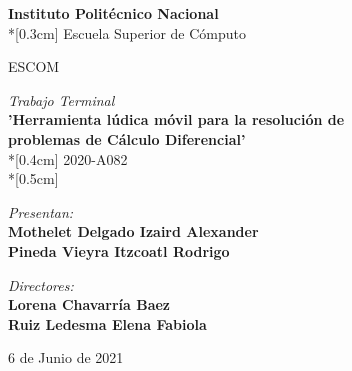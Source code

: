 
\begin{titlepage}


        \begin{center}
            \huge \textbf{Instituto Politécnico Nacional}\\*[0.3cm]%
            \LARGE {Escuela Superior de Cómputo}\\%
            \vspace{1cm}
            \begin{center}
                \LARGE{ESCOM}
            \end{center}
            \vspace{1cm}
            \large{\textit{Trabajo Terminal}}\\%
            \Large {\bf 'Herramienta lúdica móvil para la resolución de \\ problemas de Cálculo Diferencial'}\\*[0.4cm]
            \large {2020-A082 }\\*[0.5cm]
        \end{center}

    \begin{center}
    \vspace{1cm} %
   \textit{Presentan:}\\ 
   \bf{Mothelet Delgado Izaird  Alexander\\
    Pineda Vieyra Itzcoatl Rodrigo\\}
    
    \vspace{1cm} %
    \textit{Directores:}\\ 
    \bf{Lorena Chavarría Baez\\
    Ruiz Ledesma Elena Fabiola \\}
    \end{center}
    \null\vfill\hfill 6 de Junio de 2021
\end{titlepage}
